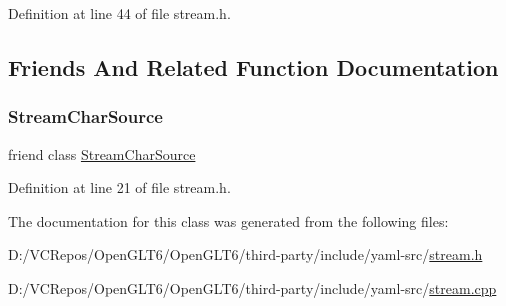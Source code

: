 Definition at line 44 of file stream.\+h.



\subsection{Friends And Related Function Documentation}
\mbox{\label{class_y_a_m_l_1_1_stream_ab86b2135b1417f3c5782b5b7163f0758}} 
\subsubsection{\texorpdfstring{StreamCharSource}{StreamCharSource}}
{\footnotesize\ttfamily friend class \mbox{\hyperlink{class_y_a_m_l_1_1_stream_char_source}{Stream\+Char\+Source}}\hspace{0.3cm}{\ttfamily [friend]}}



Definition at line 21 of file stream.\+h.



The documentation for this class was generated from the following files\+:\begin{DoxyCompactItemize}
\item 
D\+:/\+V\+C\+Repos/\+Open\+G\+L\+T6/\+Open\+G\+L\+T6/third-\/party/include/yaml-\/src/\mbox{\hyperlink{stream_8h}{stream.\+h}}\item 
D\+:/\+V\+C\+Repos/\+Open\+G\+L\+T6/\+Open\+G\+L\+T6/third-\/party/include/yaml-\/src/\mbox{\hyperlink{stream_8cpp}{stream.\+cpp}}\end{DoxyCompactItemize}
